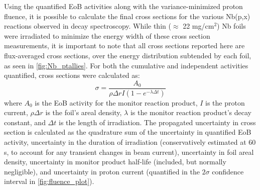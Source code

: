 \documentclass[3p]{elsarticle}
\newcommand{\pp}[1]{\left( #1\right)}
\begin{document}
Using the quantified EoB activities along with the variance-minimized proton fluence, it is possible to calculate the final cross sections for the various Nb(p,x) reactions observed in decay spectroscopy.
While thin ($\approx$ 22 mg/cm$^2$) Nb foils were irradiated to minimize the energy width of these cross section measurements, it is important to note that all cross sections reported here are flux-averaged cross sections, over the energy distribution subtended by each foil, as seen in \autoref{fig:Nb_ptallies}.
For both the cumulative and independent activities quantified, cross sections were calculated as:
\begin{equation}
\sigma = \dfrac{A_0 }{\rho \Delta r I \pp{1-e^{-\lambda \Delta t}} }
\end{equation}
where $A_0$ is the EoB activity for the monitor reaction product, $I$ is the proton current, $\rho \Delta r$ is the foil's areal density, $\lambda$ is the monitor reaction product's decay constant, and $\Delta t$ is the length of irradiation.
The propagated uncertainty in cross section is calculated as the quadrature sum of the uncertainty in quantified EoB activity, uncertainty in the duration of irradiation (conservatively estimated at 60 s, to account for any transient changes in beam current), uncertainty in foil areal density, uncertainty in monitor product half-life (included, but normally negligible),  and uncertainty in proton current (quantified in the $2\sigma$ confidence interval in \autoref{fig:fluence_plot}).





 

% 
\end{document}
